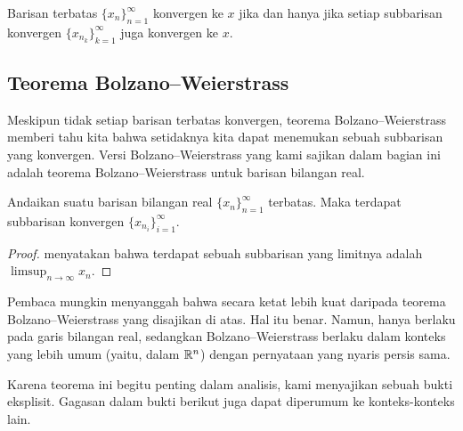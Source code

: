 \begin{prop} \label{seqconvsubseqconv:prop}
Barisan terbatas $\{ x_n \}_{n=1}^\infty$ konvergen ke $x$
jika dan hanya jika
setiap subbarisan konvergen
$\{ x_{n_k} \}_{k=1}^\infty$ juga konvergen ke $x$.
\end{prop}

\subsection{Teorema Bolzano--Weierstrass}

Meskipun tidak setiap barisan terbatas konvergen, teorema
Bolzano--Weierstrass memberi tahu kita bahwa setidaknya kita dapat menemukan
sebuah subbarisan yang konvergen.
Versi Bolzano--Weierstrass yang kami sajikan dalam bagian ini adalah
teorema Bolzano--Weierstrass untuk barisan bilangan real.

\begin{thm}\label{thm:bwseq}
Andaikan suatu barisan bilangan real $\{ x_n \}_{n=1}^\infty$ terbatas.
Maka terdapat subbarisan konvergen $\{ x_{n_i} \}_{i=1}^\infty$.
\end{thm}

\begin{proof}
 menyatakan bahwa terdapat
sebuah subbarisan yang limitnya adalah $\limsup_{n\to\infty} x_n$.
\end{proof}

Pembaca mungkin menyanggah bahwa
 secara ketat lebih kuat daripada teorema
Bolzano--Weierstrass yang disajikan di atas.  Hal itu benar.
Namun,
 hanya berlaku pada garis bilangan real, sedangkan
Bolzano--Weierstrass berlaku dalam konteks yang lebih umum (yaitu, dalam ${\mathbb{R}}^n$)
dengan pernyataan yang nyaris persis sama.

Karena teorema ini begitu penting dalam analisis, kami menyajikan sebuah
bukti eksplisit.
Gagasan dalam bukti berikut juga dapat diperumum ke konteks-konteks lain.

